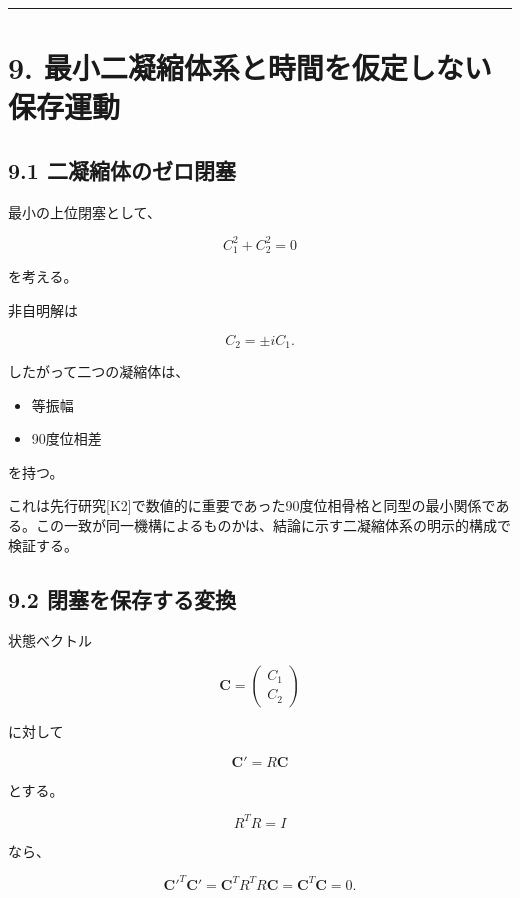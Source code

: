 \documentclass[
  a4paper,
]{ltjsarticle}
\providecommand{\tightlist}{%
  \setlength{\itemsep}{0pt}\setlength{\parskip}{0pt}}
\begin{document}
\begin{center}\rule{0.5\linewidth}{0.5pt}\end{center}

\section{9.
最小二凝縮体系と時間を仮定しない保存運動}\label{ux6700ux5c0fux4e8cux51ddux7e2eux4f53ux7cfbux3068ux6642ux9593ux3092ux4eeeux5b9aux3057ux306aux3044ux4fddux5b58ux904bux52d5}

\subsection{9.1
二凝縮体のゼロ閉塞}\label{ux4e8cux51ddux7e2eux4f53ux306eux30bcux30edux9589ux585e}

最小の上位閉塞として、

\[
\boxed{
C_1^2+C_2^2=0
}
\]

を考える。

非自明解は

\[
C_2=\pm iC_1.
\]

したがって二つの凝縮体は、

\begin{itemize}
\tightlist
\item
  等振幅
\item
  90度位相差
\end{itemize}

を持つ。

これは先行研究{[}K2{]}で数値的に重要であった90度位相骨格と同型の最小関係である。この一致が同一機構によるものかは、結論に示す二凝縮体系の明示的構成で検証する。

\subsection{9.2
閉塞を保存する変換}\label{ux9589ux585eux3092ux4fddux5b58ux3059ux308bux5909ux63db}

状態ベクトル

\[
\mathbf C=
\begin{pmatrix}
C_1\\
C_2
\end{pmatrix}
\]

に対して

\[
\mathbf C'=R\mathbf C
\]

とする。

\[
R^TR=I
\]

なら、

\[
{\mathbf C'}^T\mathbf C'
=
\mathbf C^TR^TR\mathbf C
=
\mathbf C^T\mathbf C
=
0.
\]
\end{document}
